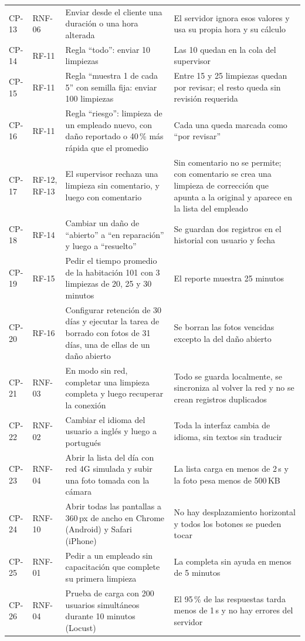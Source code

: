\documentclass[11pt,a4paper]{article}
\begin{document}
{\begin{longtable}{L{1.1cm} L{1.5cm} L{6.3cm} L{5.6cm}}
CP-13 & RNF-06 & Enviar desde el cliente una duración o una hora alterada & El servidor ignora esos valores y usa su propia hora y su cálculo\\
CP-14 & RF-11 & Regla \enquote{todo}: enviar 10 limpiezas & Las 10 quedan en la cola del supervisor\\
CP-15 & RF-11 & Regla \enquote{muestra 1 de cada 5} con semilla fija: enviar 100 limpiezas & Entre 15 y 25 limpiezas quedan por revisar; el resto queda sin revisión requerida\\
CP-16 & RF-11 & Regla \enquote{riesgo}: limpieza de un empleado nuevo, con daño reportado o 40\,\% más rápida que el promedio & Cada una queda marcada como \enquote{por revisar}\\
CP-17 & RF-12, RF-13 & El supervisor rechaza una limpieza sin comentario, y luego con comentario & Sin comentario no se permite; con comentario se crea una limpieza de corrección que apunta a la original y aparece en la lista del empleado\\
CP-18 & RF-14 & Cambiar un daño de \enquote{abierto} a \enquote{en reparación} y luego a \enquote{resuelto} & Se guardan dos registros en el historial con usuario y fecha\\
CP-19 & RF-15 & Pedir el tiempo promedio de la habitación 101 con 3 limpiezas de 20, 25 y 30 minutos & El reporte muestra 25 minutos\\
CP-20 & RF-16 & Configurar retención de 30 días y ejecutar la tarea de borrado con fotos de 31 días, una de ellas de un daño abierto & Se borran las fotos vencidas excepto la del daño abierto\\
CP-21 & RNF-03 & En modo sin red, completar una limpieza completa y luego recuperar la conexión & Todo se guarda localmente, se sincroniza al volver la red y no se crean registros duplicados\\
CP-22 & RNF-02 & Cambiar el idioma del usuario a inglés y luego a portugués & Toda la interfaz cambia de idioma, sin textos sin traducir\\
CP-23 & RNF-04 & Abrir la lista del día con red 4G simulada y subir una foto tomada con la cámara & La lista carga en menos de 2\,s y la foto pesa menos de 500\,KB\\
CP-24 & RNF-10 & Abrir todas las pantallas a 360\,px de ancho en Chrome (Android) y Safari (iPhone) & No hay desplazamiento horizontal y todos los botones se pueden tocar\\
CP-25 & RNF-01 & Pedir a un empleado sin capacitación que complete su primera limpieza & La completa sin ayuda en menos de 5 minutos\\
CP-26 & RNF-04 & Prueba de carga con 200 usuarios simultáneos durante 10 minutos (Locust) & El 95\,\% de las respuestas tarda menos de 1\,s y no hay errores del servidor\\
\end{longtable}
}
\end{document}
